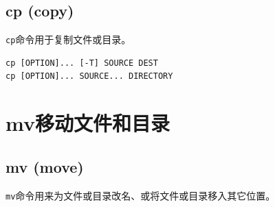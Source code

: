 \documentclass[12pt, openany, oneside]{book}
\begin{document}
\subsection{cp (copy)}

\lstinline|cp|命令用于复制文件或目录。

\vspace{-0.5cm}
\begin{lstlisting}
cp [OPTION]... [-T] SOURCE DEST
cp [OPTION]... SOURCE... DIRECTORY
\end{lstlisting}

\begin{table}[H]
    \centering
    \caption{\lstinline|cp|参数说明}
\end{table}

\newpage

\section{mv移动文件和目录}

\subsection{mv (move)}

\lstinline|mv|命令用来为文件或目录改名、或将文件或目录移入其它位置。
\end{document}

